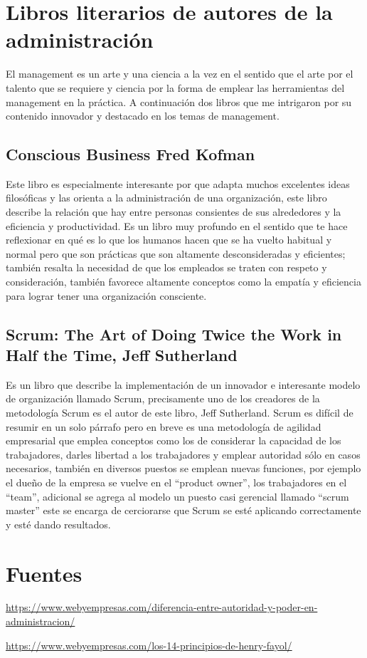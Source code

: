 \documentclass{article}
\begin{document}
\section{Libros literarios de autores de la administración}
El management es un arte y una ciencia a la vez en el sentido que el arte por el talento que se requiere y ciencia por la forma de emplear las herramientas del management en la práctica. A continuación dos libros que me intrigaron por su contenido innovador y destacado en los temas de management.

\subsection{Conscious Business Fred Kofman}
Este libro es especialmente interesante por que adapta muchos excelentes ideas filosóficas y las orienta a la administración de una organización, este libro describe la relación que hay entre personas consientes de sus alrededores y la eficiencia y productividad. Es un libro muy profundo en el sentido que te hace reflexionar en qué es lo que los humanos hacen que se ha vuelto habitual y normal pero que son prácticas que son altamente desconsideradas y eficientes; también resalta la necesidad de que los empleados se traten con respeto y consideración, también favorece altamente conceptos como la empatía y eficiencia para lograr tener una organización consciente. 

\subsection{Scrum: The Art of Doing Twice the Work in Half the Time, Jeff Sutherland}
Es un libro que describe la implementación de un innovador e interesante modelo de organización llamado Scrum, precisamente uno de los creadores de la metodología Scrum es el autor de este libro, Jeff Sutherland. Scrum es difícil de resumir en un solo párrafo pero en breve es una metodología de agilidad empresarial que emplea conceptos como los de considerar la capacidad de los trabajadores, darles libertad a los trabajadores y emplear autoridad sólo en casos necesarios, también en diversos puestos se emplean nuevas funciones, por ejemplo el dueño de la empresa se vuelve en el ``product owner'', los trabajadores en el ``team'', adicional se agrega al modelo un puesto casi gerencial llamado ``scrum master'' este se encarga de cerciorarse que Scrum se esté aplicando correctamente y esté dando resultados.



\section{Fuentes}
\begin{enumerate}[label={[\arabic*]}]
    \item \url{https://www.webyempresas.com/diferencia-entre-autoridad-y-poder-en-administracion/}
    \item \url{https://www.webyempresas.com/los-14-principios-de-henry-fayol/}
\end{enumerate}
\end{document}
